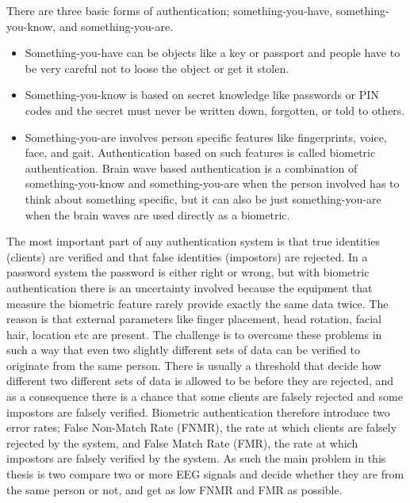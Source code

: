 \documentclass[a4paper,11pt]{article}
\begin{document}
There are three basic forms of authentication; something-you-have, something-you-know, and something-you-are.
\begin{itemize}
\item Something-you-have can be objects like a key or passport and people have to be very careful not to loose the object or get it stolen.
\item Something-you-know is based on secret knowledge like passwords or PIN codes and the secret must never be written down, forgotten, or told to others.
\item Something-you-are involves person specific features like fingerprints, voice, face, and gait. Authentication based on such features is called biometric authentication. Brain wave based authentication is a combination of something-you-know and something-you-are when the person involved has to think about something specific, but it can also be just something-you-are when the brain waves are used directly as a biometric.
\end{itemize}
 
The most important part of any authentication system is that true identities (clients) are verified and that false identities (impostors) are rejected. In a password system the password is either right or wrong, but with biometric authentication there is an uncertainty involved because the equipment that  measure the biometric feature rarely provide exactly the same data twice. The reason is that external parameters like finger placement, head rotation, facial hair, location etc are present. The challenge is to overcome these problems in such a way that even two slightly different sets of data can be verified to originate from the same person. There is usually a threshold that decide how different
two different sets of data is allowed to be before they are rejected, and as a consequence there is a chance that some clients are falsely rejected and some impostors are falsely verified.
Biometric authentication therefore introduce two error rates; False Non-Match Rate (FNMR), the rate at which clients are falsely rejected by the system, and False Match Rate (FMR), the rate at which impostors are falsely verified by the system. As such the main problem in this thesis is two compare two or more EEG signals and decide whether they are from the same person or not, and get as low FNMR and FMR as possible.
\end{document}
